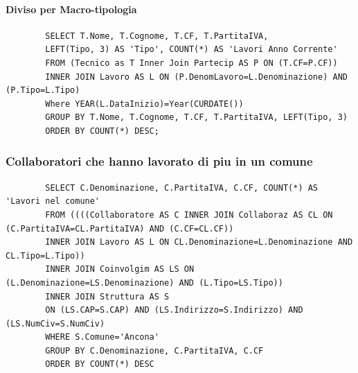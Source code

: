 \documentclass{elegantbook}
\begin{document}
	\paragraph{Diviso per Macro-tipologia}
	\begin{verbatim}
		SELECT T.Nome, T.Cognome, T.CF, T.PartitaIVA, 
		LEFT(Tipo, 3) AS 'Tipo', COUNT(*) AS 'Lavori Anno Corrente'
		FROM (Tecnico as T Inner Join Partecip AS P ON (T.CF=P.CF))
		INNER JOIN Lavoro AS L ON (P.DenomLavoro=L.Denominazione) AND (P.Tipo=L.Tipo)
		Where YEAR(L.DataInizio)=Year(CURDATE())
		GROUP BY T.Nome, T.Cognome, T.CF, T.PartitaIVA, LEFT(Tipo, 3)
		ORDER BY COUNT(*) DESC;
	\end{verbatim}
\subsubsection{Collaboratori che hanno lavorato di piu in un comune}
	\begin{verbatim}
		SELECT C.Denominazione, C.PartitaIVA, C.CF, COUNT(*) AS 'Lavori nel comune'
		FROM ((((Collaboratore AS C INNER JOIN Collaboraz AS CL ON (C.PartitaIVA=CL.PartitaIVA) AND (C.CF=CL.CF))
		INNER JOIN Lavoro AS L ON CL.Denominazione=L.Denominazione AND CL.Tipo=L.Tipo))
		INNER JOIN Coinvolgim AS LS ON (L.Denominazione=LS.Denominazione) AND (L.Tipo=LS.Tipo))
		INNER JOIN Struttura AS S 
		ON (LS.CAP=S.CAP) AND (LS.Indirizzo=S.Indirizzo) AND (LS.NumCiv=S.NumCiv)
		WHERE S.Comune='Ancona'
		GROUP BY C.Denominazione, C.PartitaIVA, C.CF
		ORDER BY COUNT(*) DESC
	\end{verbatim}
	\begin{figure}[H]
		\centering
	\end{figure}
\end{document}
